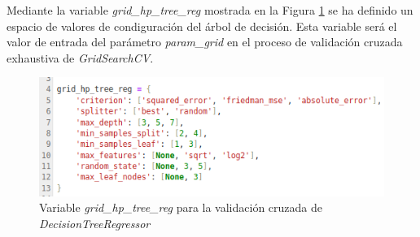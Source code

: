 \documentclass[12pt,a4paper,Spanish]{article}
\begin{document}
Mediante la variable \textit{grid\_hp\_tree\_reg} mostrada en la Figura \ref{fig:paramstree} se ha definido un espacio de valores de condiguración del árbol de decisión. Esta variable será el valor de entrada del parámetro \textit{param\_grid} en el proceso de validación cruzada exhaustiva de \textit{GridSearchCV}.
\begin{figure}[H]
	\centering
	\includegraphics[width=0.7\linewidth]{figs/params_tree}
	\caption{Variable \textit{grid\_hp\_tree\_reg} para la validación cruzada de \textit{DecisionTreeRegressor}}
	\label{fig:paramstree}
\end{figure}
\end{document}
